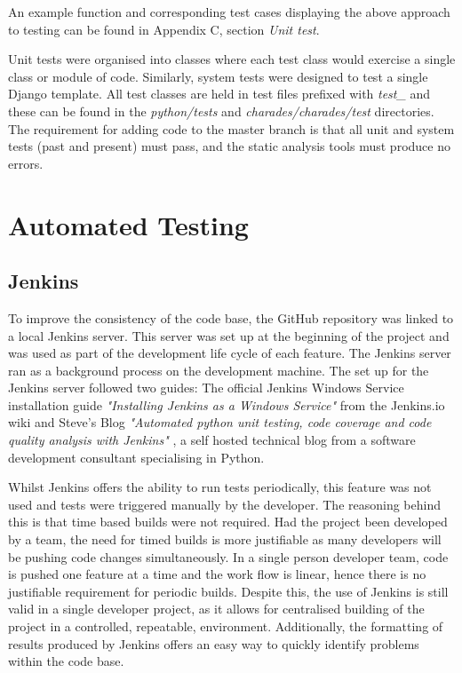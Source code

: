 An example function and corresponding test cases displaying the above approach to testing can be found in Appendix C, section \textit{Unit test}.

Unit tests were organised into classes where each test class would exercise a single class or module of code. Similarly, system tests were designed to test a single Django template. All test classes are held in test files prefixed with \textit{test\_} and these can be found in the \textit{python/tests} and \textit{charades/charades/test} directories. The requirement for adding code to the master branch is that all unit and system tests (past and present) must pass, and the static analysis tools must produce no errors.


\section{Automated Testing}
\subsection{Jenkins}
To improve the consistency of the code base, the GitHub repository was linked to a local Jenkins server. This server was set up at the beginning of the project and was used as part of the development life cycle of each feature. The Jenkins server ran as a background process on the development machine. The set up for the Jenkins server followed two guides: The official Jenkins Windows Service installation guide \textit{"Installing Jenkins as a Windows Service"} \cite{jenkins_wiki_install} from the Jenkins.io wiki and Steve's Blog \textit{"Automated python unit testing, code coverage and code quality analysis with Jenkins"} \cite{steves_blog}, a self hosted technical blog from a software development consultant specialising in Python.

Whilst Jenkins offers the ability to run tests periodically, this feature was not used and tests were triggered manually by the developer. The reasoning behind this is that time based builds were not required. Had the project been developed by a team, the need for timed builds is more justifiable as many developers will be pushing code changes simultaneously. In a single person developer team, code is pushed one feature at a time and the work flow is linear, hence there is no justifiable requirement for periodic builds. Despite this, the use of Jenkins is still valid in a single developer project, as it allows for centralised building of the project in a controlled, repeatable, environment. Additionally, the formatting of results produced by Jenkins offers an easy way to quickly identify problems within the code base.

